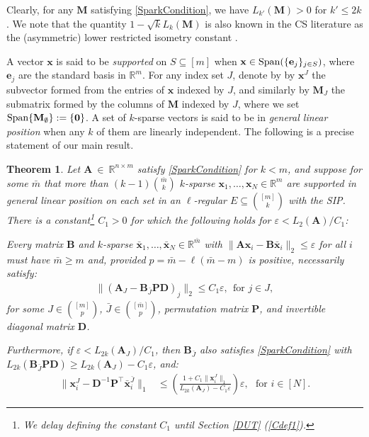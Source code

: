 \documentclass[9pt,twocolumn]{pnas-new}
\newtheorem{theorem}{Theorem}
\begin{document}
Clearly, for any $\mathbf{M}$ satisfying \eqref{SparkCondition}, we have $L_{k'}(\mathbf{M}) > 0$ for  $k' \leq 2k$. We note that the quantity $1 - \sqrt{k} L_k(\mathbf{M})$ is also known in the CS literature as the (asymmetric) lower restricted isometry constant \cite{Blanchard2011}.%
 
A vector $\mathbf{x}$ is said to be \emph{supported} on $S \subseteq [m]$ when $\mathbf{x} \in \text{\rm Span}( \{\mathbf{e}_j\}_{j\in S})$, where $\mathbf{e}_j$ are the standard basis in $\mathbb R^m$. For any index set $J$, denote by by $\mathbf{x}^J$ the subvector formed from the entries of $\mathbf{x}$ indexed by $J$, and similarly by $\mathbf{M}_J$ the submatrix formed by the columns of $\mathbf{M}$ indexed by $J$, where we set $\text{\rm Span}\{\mathbf{M}_\emptyset\} := \{\textbf{0}\}$. A set of $k$-sparse vectors is said to be in \emph{general linear position} when any $k$ of them are linearly independent. The following is a precise statement of our main result.

\begin{theorem}\label{DeterministicUniquenessTheorem}
Let $\mathbf{A}~\in~\mathbb{R}^{n \times m}$ satisfy \eqref{SparkCondition} for $k < m$, and suppose for some $\bar m$ that more than \mbox{$(k-1){\bar m \choose k}$} $k$-sparse \mbox{$\mathbf{x}_1, \ldots, \mathbf{x}_N \in \mathbb{R}^m$} are supported in general linear position on each set in an $\ell$-regular $E \subseteq {[m] \choose k}$ with the SIP.  There is a constant\footnote{We delay defining the constant $C_1$ until Section \ref{DUT} (\eqref{Cdef1}).} $C_1 > 0$ for which the following holds for $\varepsilon < L_2(\mathbf{A}) / C_1$:

Every matrix $\mathbf{B}$ and $k$-sparse $\mathbf{\bar x}_1, \ldots, \mathbf{\bar x}_N \in \mathbb{R}^{\bar m}$ with  \mbox{$\|\mathbf{A}\mathbf{x}_i - \mathbf{B}\mathbf{\bar x}_i\|_2 \leq \varepsilon$} for all $i$ must have $\bar m \geq m$ and, provided $p = \bar m - \ell(\bar m - m)$ is positive, necessarily satisfy:
\begin{align}\label{Cstable}
\|(\mathbf{A}_J- \mathbf{B}_{\bar J} \mathbf{PD} )_j\|_2 \leq C_1 \varepsilon, \ \  \text{for $j \in J$},
\end{align}
for some $J \in {[m] \choose p}$, $\bar J \in {[\bar m] \choose p}$, permutation matrix $\mathbf{P}$, and invertible diagonal matrix $\mathbf{D}$.

Furthermore, if $\varepsilon < L_{2k}(\mathbf{A}_J) / C_1$, then $\mathbf{B}_{\bar J}$ also satisfies \eqref{SparkCondition} with $L_{2k}(\mathbf{B}_{\bar J}\mathbf{PD}) \geq L_{2k}(\mathbf{A}_J) - C_1 \varepsilon$, and:
\begin{align}\label{b-PDa}
\|\mathbf{x}_i^J - \mathbf{D}^{-1}\mathbf{P}^{\top}\mathbf{\bar x}_i^{\bar J}\|_1 &\leq  \left( \frac{ 1+C_1 \|\mathbf{x}_i^{J}\|_1 }{ L_{2k}(\mathbf{A}_J) -  C_1\varepsilon } \right) \varepsilon,\ \ \   \text{for $i \in [N]$}.
\end{align}
\end{theorem}
\end{document}
